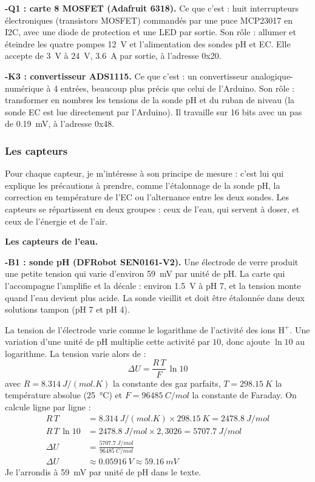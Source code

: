 \textbf{-Q1 : carte 8 MOSFET (Adafruit 6318).} Ce que c'est : huit interrupteurs électroniques (transistors MOSFET) commandés par une puce MCP23017 en I2C, avec une diode de protection et une LED par sortie. Son rôle : allumer et éteindre les quatre pompes \qty{12}{V} et l'alimentation des sondes pH et EC. Elle accepte de \qty{3}{V} à \qty{24}{V}, \qty{3,6}{A} par sortie, à l'adresse 0x20.

\textbf{-K3 : convertisseur ADS1115.} Ce que c'est : un convertisseur analogique-numérique à 4 entrées, beaucoup plus précis que celui de l'Arduino. Son rôle : transformer en nombres les tensions de la sonde pH et du ruban de niveau (la sonde EC est lue directement par l'Arduino). Il travaille sur 16 bits avec un pas de \qty{0,19}{mV}, à l'adresse 0x48.

\subsubsection*{Les capteurs}

Pour chaque capteur, je m'intéresse à son principe de mesure : c'est lui qui explique les précautions à prendre, comme l'étalonnage de la sonde pH, la correction en température de l'EC ou l'alternance entre les deux sondes. Les capteurs se répartissent en deux groupes : ceux de l'eau, qui servent à doser, et ceux de l'énergie et de l'air.

\textbf{Les capteurs de l'eau.}

\textbf{-B1 : sonde pH (DFRobot SEN0161-V2).} Une électrode de verre produit une petite tension qui varie d'environ \qty{59}{mV} par unité de pH. La carte qui l'accompagne l'amplifie et la décale : environ \qty{1,5}{V} à pH 7, et la tension monte quand l'eau devient plus acide. La sonde vieillit et doit être étalonnée dans deux solutions tampon (pH 7 et pH 4).

\begin{demonstration}
La tension de l'électrode varie comme le logarithme de l'activité des ions $\mathrm{H^+}$. Une variation d'une unité de pH multiplie cette activité par $10$, donc ajoute $\ln 10$ au logarithme. La tension varie alors de :
\[
\Delta U = \frac{R\,T}{F}\,\ln 10
\]
avec $R = \qty{8,314}{J/(mol.K)}$ la constante des gaz parfaits, $T = \qty{298,15}{K}$ la température absolue (\qty{25}{\celsius}) et $F = \qty{96485}{C/mol}$ la constante de Faraday. On calcule ligne par ligne :
\begin{align*}
R\,T &= \qty{8,314}{J/(mol.K)} \times \qty{298,15}{K} = \qty{2478,8}{J/mol}\\
R\,T\,\ln 10 &= \qty{2478,8}{J/mol} \times 2{,}3026 = \qty{5707,7}{J/mol}\\
\Delta U &= \frac{\qty{5707,7}{J/mol}}{\qty{96485}{C/mol}}\\
\Delta U &\approx \qty{0,05916}{V} \approx \qty{59,16}{mV}
\end{align*}
Je l'arrondis à \qty{59}{mV} par unité de pH dans le texte.
\end{demonstration}

